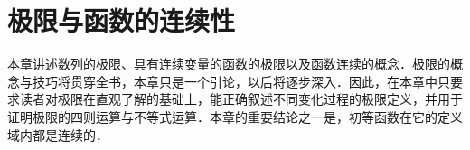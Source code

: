 \chapter{极限与函数的连续性}\label{chap:03}

本章讲述数列的极限、具有连续变量的函数的极限以及函数连续的概念．极限的概念与技巧将贯穿全书，本章只是一个引论，以后将逐步深入．因此，在本章中只要求读者对极限在直观了解的基础上，能正确叙述不同变化过程的极限定义，并用于证明极限的四则运算与不等式运算．本章的重要结论之一是，初等函数在它的定义域内都是连续的．






